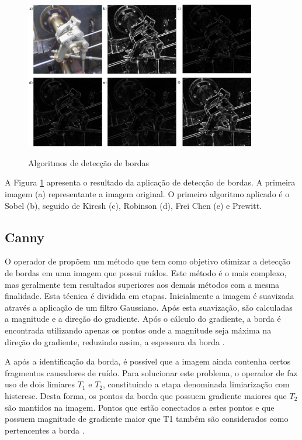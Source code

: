 \documentclass[
	12pt,				%
	oneside,			%
	a4paper,			%
	english,			%
	french,				%
	spanish,			%
	brazil,				%
	]{abntex2}
\begin{document}
\begin{figure}[ht]
\centering
\caption{Algoritmos de detecção de bordas}
\includegraphics[width=0.9\textwidth]{imagens/deteccao_bordas.png}
\sourceAuthor
\label{fig:deteccao_bordas}
\end{figure}

A Figura \ref{fig:deteccao_bordas} apresenta o resultado da aplicação de detecção de bordas. A primeira imagem (a) representante a imagem original. O primeiro algoritmo aplicado é o Sobel (b), seguido de Kircsh (c), Robinson (d), Frei Chen (e) e Prewitt.

\subsection{Canny}

O operador de \citet{canny:1986} propõem um método que tem como objetivo otimizar a detecção de bordas em uma imagem que possui ruídos. Este método é o mais complexo, mas geralmente tem resultados superiores aos demais métodos com a mesma finalidade. Esta técnica é dividida em etapas. Inicialmente a imagem é suavizada através a aplicação de um filtro Gaussiano. Após esta suavização, são calculadas a magnitude e a direção do gradiente. Após o cálculo do gradiente, a borda é encontrada utilizando apenas os pontos onde a magnitude seja máxima na direção do gradiente, reduzindo assim, a espessura da borda \cite{pedriniSchwartz:2008}.

A após a identificação da borda, é possível que a imagem ainda contenha certos fragmentos causadores de ruído. Para solucionar este problema, o operador de \citet{canny:1986} faz uso de dois limiares \(T_1\) e \(T_2\), constituindo a etapa denominada limiarização com histerese. Desta forma, os pontos da borda que possuem gradiente maiores que \(T_2\) são mantidos na imagem. Pontos que estão conectados a estes pontos e que possuem magnitude de gradiente maior que T1 também são considerados como pertencentes a borda \cite{pedriniSchwartz:2008}.
\end{document}
